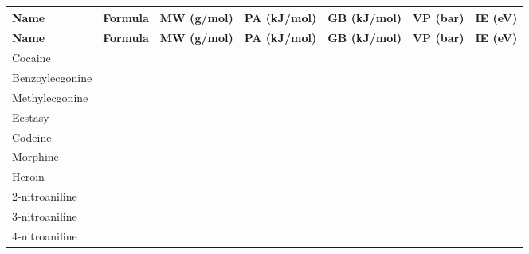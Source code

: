 \begin{landscape}
\begin{longtable}[c]{@{}lcccccc@{}}
\toprule
\textbf{Name}        & \textbf{Formula} & \textbf{MW (g/mol)} & \textbf{PA (kJ/mol)} & \textbf{GB (kJ/mol)} &  \textbf{VP (bar)}& \textbf{IE (eV)} \\* \midrule
\endfirsthead
%
\toprule
\textbf{Name}        & \textbf{Formula} & \textbf{MW (g/mol)} & \textbf{PA (kJ/mol)} & \textbf{GB (kJ/mol)} &  \textbf{VP (bar)}& \textbf{IE (eV)} \\* \midrule
\endhead
%
\bottomrule
\endfoot
%
\endlastfoot
%
Cocaine              &                  &                     &                              &                               &                          &                  \\
Benzoylecgonine      &                  &                     &                              &                               &                          &                  \\
Methylecgonine       &                  &                     &                              &                               &                          &                  \\
Ecstasy              &                  &                     &                              &                               &                          &                  \\
Codeine              &                  &                     &                              &                               &                          &                  \\
Morphine             &                  &                     &                              &                               &                          &                  \\
Heroin               &                  &                     &                              &                               &                          &                  \\
2-nitroaniline       &                  &                     &                              &                               &                          &                  \\
3-nitroaniline       &                  &                     &                              &                               &                          &                  \\
4-nitroaniline       &                  &                     &                              &                               &                          &                  \\

\end{longtable}
\end{landscape}
